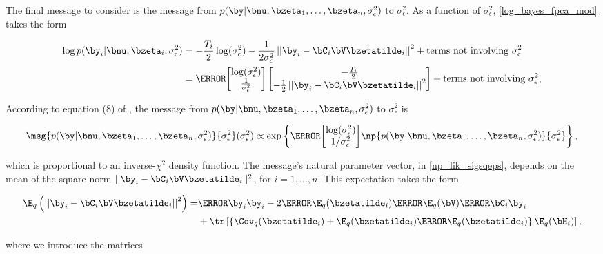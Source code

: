 \documentclass[12pt]{article}
\theoremstyle{plain}
\theoremstyle{definition}
\theoremstyle{remark}
\def\sigsqeps{\sigma^2_{\epsilon}}
\newcommand\tni[1]{\text{terms not involving $#1$}}
\begin{document}
The final message to consider is the message from $p (\by | \bnu, \bzeta_1, \dots, \bzeta_n, \sigsqeps)$ to
$\sigsqeps$. As a function of $\sigsqeps$, \eqref{log_bayes_fpca_mod} takes the form

\begin{align*}
	\log p (\by_i | \bnu, \bzeta_i, \sigsqeps)
		& = -\frac{T_i}{2} \log (\sigsqeps) - \frac{1}{2 \sigsqeps} \left|\left|
			\by_i - \bC_i \bV \bzetatilde_i
		\right|\right|^2 + \tni{\sigsqeps} \\
		& = \T{
			\begin{bmatrix}
				\log (\sigsqeps) \\
				\frac{1}{\sigsqeps}
			\end{bmatrix}
		} \begin{bmatrix}
			-\frac{T_i}{2} \\
			-\frac12 \left|\left| \by_i - \bC_i \bV \bzetatilde_i \right|\right|^2
		\end{bmatrix} + \tni{\sigsqeps},
\end{align*}

\noindent According to equation (8) of \citet{wand17}, the message from $p (\by | \bnu,
\bzeta_1, \dots, \bzeta_n, \sigsqeps)$ to $\sigsqeps$ is

\[
	\msg{p (\by | \bnu, \bzeta_1, \dots, \bzeta_n, \sigsqeps)}{\sigsqeps} (\sigsqeps) \propto
		\exp \left\{
			\T{\begin{bmatrix}
				\log (\sigsqeps) \\
				1/\sigsqeps
			\end{bmatrix}}
			\np{p (\by | \bnu, \bzeta_1, \dots, \bzeta_n, \sigsqeps)}{\sigsqeps}
		\right\},
\]

\noindent which is proportional
to an inverse-$\chi^2$ density function. The message's natural parameter vector, in \eqref{np_lik_sigsqeps}, depends
on the mean of the square norm $|| \by_i - \bC_i \bV \bzetatilde_i ||^2$, for $i = 1, \dots, n$.
This expectation takes the form

\begin{align*}
	\E_q \left(
		\left|\left| \by_i - \bC_i \bV \bzetatilde_i \right|\right|^2
	\right) =
		& \T{\by_i} \by_i - 2 \T{\E_q (\bzetatilde_i)} \T{\E_q (\bV)} \T{\bC_i} \by_i \\
		& + \tr \left[
			\left\{ \Cov_q (\bzetatilde_i) + \E_q (\bzetatilde_i) \T{\E_q (\bzetatilde_i)} \right\} \E_q (\bH_i)
		\right],
\end{align*}

\noindent where we introduce the matrices
\end{document}
